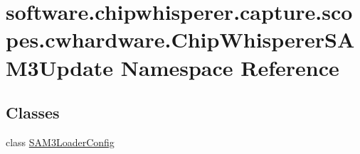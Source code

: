 \hypertarget{namespacesoftware_1_1chipwhisperer_1_1capture_1_1scopes_1_1cwhardware_1_1ChipWhispererSAM3Update}{}\section{software.\+chipwhisperer.\+capture.\+scopes.\+cwhardware.\+Chip\+Whisperer\+S\+A\+M3\+Update Namespace Reference}
\label{namespacesoftware_1_1chipwhisperer_1_1capture_1_1scopes_1_1cwhardware_1_1ChipWhispererSAM3Update}
\subsection*{Classes}
\begin{DoxyCompactItemize}
\item 
class \hyperlink{classsoftware_1_1chipwhisperer_1_1capture_1_1scopes_1_1cwhardware_1_1ChipWhispererSAM3Update_1_1SAM3LoaderConfig}{S\+A\+M3\+Loader\+Config}
\end{DoxyCompactItemize}
